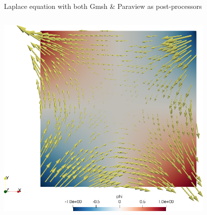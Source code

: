 \documentclass[
  ignorenonframetext,
  aspectratio=169,
]{beamer}
\begin{document}
\begin{frame}[fragile]{Laplace equation with both Gmsh \& Paraview as
post-processors}
\begin{columns}[T]
\begin{column}{0.4\textwidth}
\centering \includegraphics[width=0.8\textwidth,height=\textheight]{laplace-square-paraview.png}\\
\end{column}
\end{columns}
\end{frame}
\end{document}
